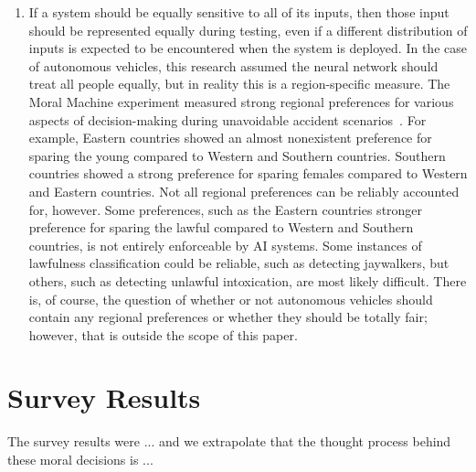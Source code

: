 \documentclass{report}
\begin{document}
\begin{enumerate}
\begin{enumerate}
        \item If a system should be equally sensitive to all of its inputs, then those input should
        be represented equally during testing, even if a different distribution of inputs is
        expected to be encountered when the system is deployed. In the case of autonomous vehicles,
        this research assumed the neural network should treat all people equally, but in reality
        this is a region-specific measure. The Moral Machine experiment measured strong regional
        preferences for various aspects of decision-making during unavoidable accident
        scenarios~\cite{awad2018moral}. For example, Eastern countries showed an almost nonexistent
        preference for sparing the young compared to Western and Southern countries. Southern
        countries showed a strong preference for sparing females compared to Western and Eastern
        countries. Not all regional preferences can be reliably accounted for, however. Some
        preferences, such as the Eastern countries stronger preference for sparing the lawful
        compared to Western and Southern countries, is not entirely enforceable by AI systems. Some
        instances of lawfulness classification could be reliable, such as detecting jaywalkers, but
        others, such as detecting unlawful intoxication, are most likely difficult. There is, of
        course, the question of whether or not autonomous vehicles should contain any regional
        preferences or whether they should be totally fair; however, that is outside the scope of
        this paper.
    \end{enumerate}
\end{enumerate}
    
\FloatBarrier
\section{Survey Results}

The survey results were ... and we extrapolate that the thought process behind these moral decisions
is ...
\end{document}
